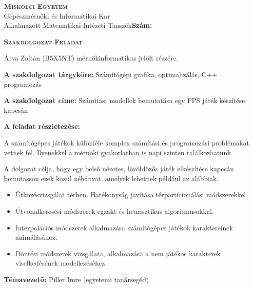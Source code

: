 \begin{flushleft}
\textsc{\bfseries Miskolci Egyetem}\\
Gépészmérnöki és Informatikai Kar\\
Alkalmazott Matematikai Intézeti Tanszék\hspace*{4cm}\hfil \textbf{Szám:}
\end{flushleft}
\vskip 0.5cm
\begin{center}
\large\textsc{\bfseries Szakdolgozat Feladat}
\end{center}
\vskip 0.5cm
Árva Zoltán (B5X5NT) mérnökinformatikus jelölt részére.\newline

\noindent\textbf{A szakdolgozat tárgyköre:} Számítógépi grafika, optimalizálás, C++ programozás\newline

\noindent\textbf{A szakdolgozat címe:} Számítási modellek bemutatása egy FPS játék készítése kapcsán\newline

\noindent\textbf{A feladat részletezése:}

\bigskip

A számítógépes játékok különféle komplex számítási és programozási problémákat vetnek fel. Ilyenekkel a mérnöki gyakorlatban is napi szinten találkozhatunk.

\medskip

A dolgozat célja, hogy egy belső nézetes, lövöldözős játék elkészítése kapcsán bemutasson ezek közül néhányat, amelyek lehetnek például az alábbiak.

\begin{itemize}
\item Ütközésvizsgálat térben. Hatékonyság javítása térpartícionálási módszerekkel.
\item Útvonalkeresési módszerek egzakt és heurisztikus algoritmusokkal.
\item Interpolációs módszerek alkalmazása számítógépes játékok karaktereinek animálásához.
\item Döntési módszerek vizsgálata, alkalmazása a nem játékos karakterek viselkedésének modellezéséhez.
\end{itemize}

\vfill

\noindent\textbf{Témavezetõ:} Piller Imre (egyetemi tanársegéd) \newline


